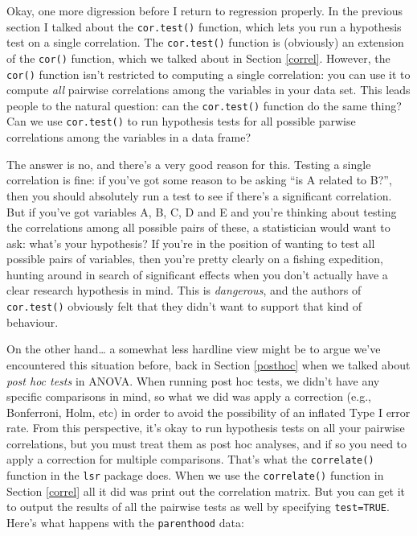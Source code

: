 \documentclass[
]{book}
\begin{document}
Okay, one more digression before I return to regression properly. In the previous section I talked about the \texttt{cor.test()} function, which lets you run a hypothesis test on a single correlation. The \texttt{cor.test()} function is (obviously) an extension of the \texttt{cor()} function, which we talked about in Section \ref{correl}. However, the \texttt{cor()} function isn't restricted to computing a single correlation: you can use it to compute \emph{all} pairwise correlations among the variables in your data set. This leads people to the natural question: can the \texttt{cor.test()} function do the same thing? Can we use \texttt{cor.test()} to run hypothesis tests for all possible parwise correlations among the variables in a data frame?

The answer is no, and there's a very good reason for this. Testing a single correlation is fine: if you've got some reason to be asking ``is A related to B?'', then you should absolutely run a test to see if there's a significant correlation. But if you've got variables A, B, C, D and E and you're thinking about testing the correlations among all possible pairs of these, a statistician would want to ask: what's your hypothesis? If you're in the position of wanting to test all possible pairs of variables, then you're pretty clearly on a fishing expedition, hunting around in search of significant effects when you don't actually have a clear research hypothesis in mind. This is \emph{dangerous}, and the authors of \texttt{cor.test()} obviously felt that they didn't want to support that kind of behaviour.

On the other hand\ldots{} a somewhat less hardline view might be to argue we've encountered this situation before, back in Section \ref{posthoc} when we talked about \emph{post hoc tests} in ANOVA. When running post hoc tests, we didn't have any specific comparisons in mind, so what we did was apply a correction (e.g., Bonferroni, Holm, etc) in order to avoid the possibility of an inflated Type I error rate. From this perspective, it's okay to run hypothesis tests on all your pairwise correlations, but you must treat them as post hoc analyses, and if so you need to apply a correction for multiple comparisons. That's what the \texttt{correlate()} function in the \texttt{lsr} package does. When we use the \texttt{correlate()} function in Section \ref{correl} all it did was print out the correlation matrix. But you can get it to output the results of all the pairwise tests as well by specifying \texttt{test=TRUE}. Here's what happens with the \texttt{parenthood} data:
\end{document}
